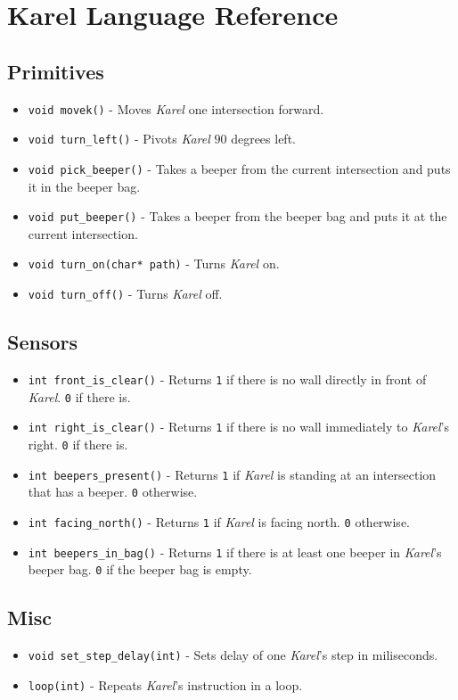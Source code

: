
\chapter{Karel Language Reference}

\section*{Primitives}

\begin{itemize}
    \item \texttt{void movek()} - Moves \textit{Karel} one intersection forward.
    \item \texttt{void turn_left()} - Pivots \textit{Karel} $90$ degrees left.
    \item \texttt{void pick_beeper()} - Takes a beeper from the current intersection and puts it in the beeper bag.
    \item \texttt{void put_beeper()} - Takes a beeper from the beeper bag and puts it at the current intersection.
    \item \texttt{void turn_on(char* path)} - Turns \textit{Karel} on.
    \item \texttt{void turn_off()} - Turns \textit{Karel} off.
\end{itemize}


\section*{Sensors}

\begin{itemize}
    \item \texttt{int front_is_clear()} - Returns \texttt{1} if there is no wall directly in front of \textit{Karel}. \texttt{0} if there is.
    \item \texttt{int right_is_clear()} - Returns \texttt{1} if there is no wall immediately to \textit{Karel}'s right. \texttt{0} if there is.
    \item \texttt{int beepers_present()} - Returns \texttt{1} if \textit{Karel} is standing at an intersection that has a beeper. \texttt{0} otherwise.
    \item \texttt{int facing_north()} - Returns \texttt{1} if \textit{Karel} is facing north. \texttt{0} otherwise.
    \item \texttt{int beepers_in_bag()} - Returns \texttt{1} if there is at least one beeper in \textit{Karel}'s beeper bag. \texttt{0} if the beeper bag is empty.
\end{itemize}


\section*{Misc}

\begin{itemize}
    \item \texttt{void set_step_delay(int)} - Sets delay of one \textit{Karel}'s step in miliseconds.
    \item \texttt{loop(int)} - Repeats \textit{Karel}'s instruction in a loop.
\end{itemize}
